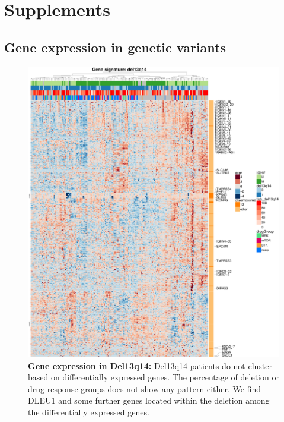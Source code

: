 
\section{Supplements}

\subsection{Gene expression in genetic variants}

\FloatBarrier

\begin{figure}
	\centering
	\includegraphics[width=\columnwidth]{./Figures/gene_exprDel13q14_gsea_Kegg.pdf}
	\caption{\textbf{Gene expression in Del13q14:} Del13q14 patients do not cluster based on differentially expressed genes. The percentage of deletion or drug response groups does not show any pattern either. We find DLEU1 and some further genes located within the deletion among the differentially expressed genes.}
	\label{fig:gene_exprdel13q14_gsea_kegg}
\end{figure}

